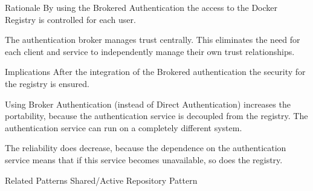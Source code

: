 \begin{patdescription}

\item[Rationale] 
By using the Brokered Authentication the access to the Docker Registry is controlled for each user.

The authentication broker manages trust centrally. This eliminates the need for each client and service to independently manage their own trust relationships.

\item[Implications] After the integration of the Brokered authentication the security for the registry is ensured. %

Using Broker Authentication (instead of Direct Authentication) increases the portability, because the authentication service is decoupled from the registry. The authentication service can run on a completely different system. 

The reliability does decrease, because the dependence on the authentication service means that if this service becomes unavailable, so does the registry.
\item [Related Patterns]
Shared/Active Repository Pattern

\end{patdescription}

